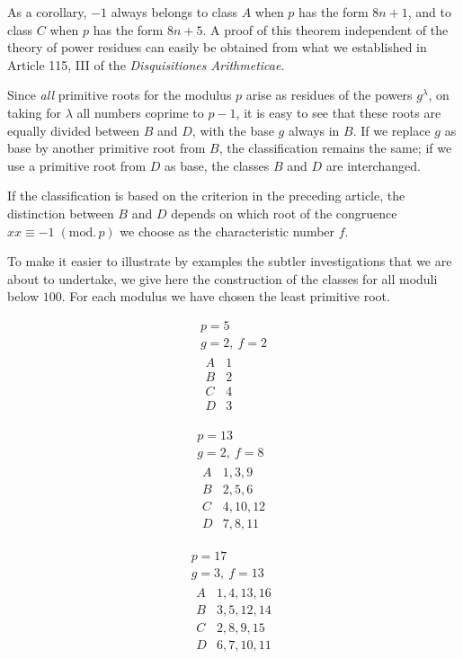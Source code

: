 As a corollary, $-1$ always belongs to class $A$ when $p$ has the form $8n+1$, and to class $C$ when $p$ has the form $8n+5$. A proof of this theorem independent of the theory of power residues can easily be obtained from what we established in Article 115, III of the \emph{Disquisitiones Arithmeticae}.

Since \emph{all} primitive roots for the modulus $p$ arise as residues of the powers $g^\lambda$, on taking for $\lambda$ all numbers coprime to $p-1$, it is easy to see that these roots are equally divided between $B$ and $D$, with the base $g$ always in $B$. If we replace $g$ as base by another primitive root from $B$, the classification remains the same; if we use a primitive root from $D$ as base, the classes $B$ and $D$ are interchanged.

%
If the classification is based on the criterion in the preceding article, the distinction between $B$ and $D$ depends on which root of the congruence $xx\equiv-1\; (\mathrm{mod.}\,p)$ we choose as the characteristic number $f$.

To make it easier to illustrate by examples the subtler investigations that we are about to undertake, we give here the construction of the classes for all moduli below $100$. For each modulus we have chosen the least primitive root.

\[
\begin{gathered}
p=5\\
g=2,\ f=2\\[3pt]
\begin{array}{c|l}
A&1\\
B&2\\
C&4\\
D&3
\end{array}
\end{gathered}
\]

\[
\begin{gathered}
p=13\\
g=2,\ f=8\\[3pt]
\begin{array}{c|l}
A&1,3,9\\
B&2,5,6\\
C&4,10,12\\
D&7,8,11
\end{array}
\end{gathered}
\]

\[
\begin{gathered}
p=17\\
g=3,\ f=13\\[3pt]
\begin{array}{c|l}
A&1,4,13,16\\
B&3,5,12,14\\
C&2,8,9,15\\
D&6,7,10,11
\end{array}
\end{gathered}
\]


